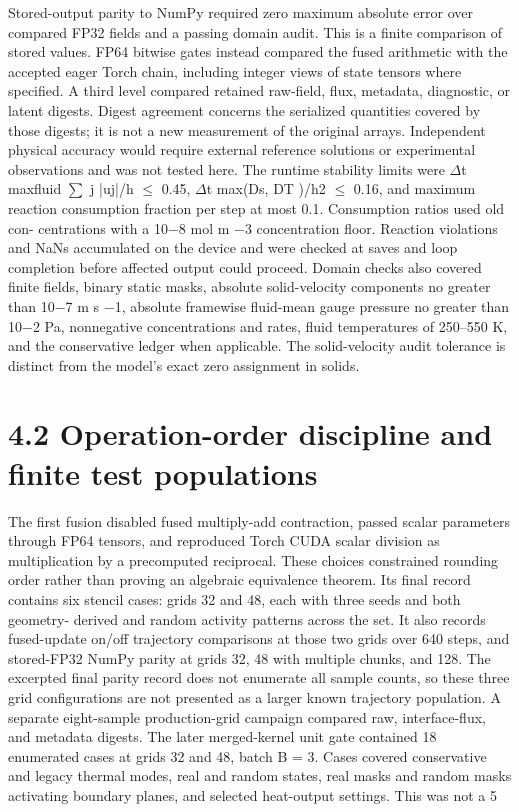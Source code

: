 \documentclass[11pt]{article}
\begin{document}
Stored-output parity to NumPy required zero maximum absolute error over compared FP32 fields
and a passing domain audit. This is a finite comparison of stored values. FP64 bitwise gates instead
compared the fused arithmetic with the accepted eager Torch chain, including integer views of state
tensors where specified. A third level compared retained raw-field, flux, metadata, diagnostic, or
latent digests. Digest agreement concerns the serialized quantities covered by those digests; it is not
a new measurement of the original arrays. Independent physical accuracy would require external
reference solutions or experimental observations and was not tested here.
The runtime stability limits were \ensuremath{\Delta}t maxfluid
\ensuremath{\sum}
j |uj|/h \ensuremath{\leq} 0.45, \ensuremath{\Delta}t max(Ds, DT )/h2 \ensuremath{\leq} 0.16, and
maximum reaction consumption fraction per step at most 0.1. Consumption ratios used old con-
centrations with a 10\ensuremath{-}8 mol m \ensuremath{-}3 concentration floor. Reaction violations and NaNs accumulated
on the device and were checked at saves and loop completion before affected output could proceed.
Domain checks also covered finite fields, binary static masks, absolute solid-velocity components
no greater than 10\ensuremath{-}7 m s \ensuremath{-}1, absolute framewise fluid-mean gauge pressure no greater than 10\ensuremath{-}2
Pa, nonnegative concentrations and rates, fluid temperatures of 250–550 K, and the conservative
ledger when applicable. The solid-velocity audit tolerance is distinct from the model’s exact zero
assignment in solids.

\section*{4.2 Operation-order discipline and finite test populations}

The first fusion disabled fused multiply-add contraction, passed scalar parameters through FP64
tensors, and reproduced Torch CUDA scalar division as multiplication by a precomputed reciprocal.
These choices constrained rounding order rather than proving an algebraic equivalence theorem.
Its final record contains six stencil cases: grids 32 and 48, each with three seeds and both geometry-
derived and random activity patterns across the set. It also records fused-update on/off trajectory
comparisons at those two grids over 640 steps, and stored-FP32 NumPy parity at grids 32, 48
with multiple chunks, and 128. The excerpted final parity record does not enumerate all sample
counts, so these three grid configurations are not presented as a larger known trajectory population.
A separate eight-sample production-grid campaign compared raw, interface-flux, and metadata
digests.
The later merged-kernel unit gate contained 18 enumerated cases at grids 32 and 48, batch
B = 3. Cases covered conservative and legacy thermal modes, real and random states, real masks
and random masks activating boundary planes, and selected heat-output settings. This was not a
5
\end{document}
